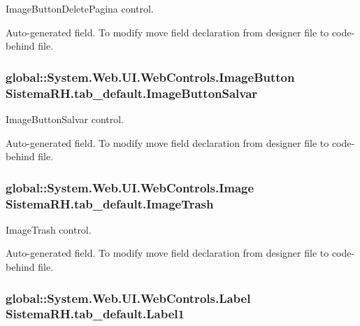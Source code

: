 ImageButtonDeletePagina control. 

Auto-\/generated field. To modify move field declaration from designer file to code-\/behind file. \hypertarget{class_sistema_r_h_1_1tab__default_a53d313f4e3b486e261b611885056e62b}{
\subsubsection[{ImageButtonSalvar}]{\setlength{\rightskip}{0pt plus 5cm}global::System.Web.UI.WebControls.ImageButton {\bf SistemaRH.tab\_\-default.ImageButtonSalvar}}}
\label{class_sistema_r_h_1_1tab__default_a53d313f4e3b486e261b611885056e62b}


ImageButtonSalvar control. 

Auto-\/generated field. To modify move field declaration from designer file to code-\/behind file. \hypertarget{class_sistema_r_h_1_1tab__default_a9e9bfdd15165e2404eadd752129626b6}{
\subsubsection[{ImageTrash}]{\setlength{\rightskip}{0pt plus 5cm}global::System.Web.UI.WebControls.Image {\bf SistemaRH.tab\_\-default.ImageTrash}}}
\label{class_sistema_r_h_1_1tab__default_a9e9bfdd15165e2404eadd752129626b6}


ImageTrash control. 

Auto-\/generated field. To modify move field declaration from designer file to code-\/behind file. \hypertarget{class_sistema_r_h_1_1tab__default_a5ec7e9c30f86846ab33a8adb67e2f53d}{
\subsubsection[{Label1}]{\setlength{\rightskip}{0pt plus 5cm}global::System.Web.UI.WebControls.Label {\bf SistemaRH.tab\_\-default.Label1}}}
\label{class_sistema_r_h_1_1tab__default_a5ec7e9c30f86846ab33a8adb67e2f53d}


